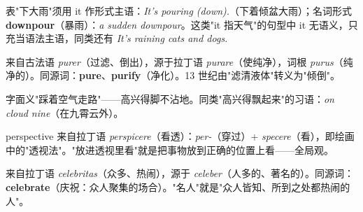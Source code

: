 \documentclass[../main.tex]{subfiles}
\begin{document}
\begin{gram}[it 作主语表天气]
表"下大雨"须用 it 作形式主语：\textit{It's pouring (down).}（下着倾盆大雨）；名词形式 \textbf{downpour}（暴雨）：\textit{a sudden downpour}。这类"it 指天气"的句型中 it 无语义，只充当语法主语，同类还有 \textit{It's raining cats and dogs.}
\end{gram}

\begin{origin}
来自古法语 \textit{purer}（过滤、倒出），源于拉丁语 \textit{purare}（使纯净），词根 \textit{purus}（纯净的）。同源词：\textbf{pure}、\textbf{purify}（净化）。13 世纪由"滤清液体"转义为"倾倒"。
\end{origin}



\begin{origin}
字面义"踩着空气走路"——高兴得脚不沾地。同类"高兴得飘起来"的习语：\textit{on cloud nine}（在九霄云外）。
\end{origin}



\begin{origin}
perspective 来自拉丁语 \textit{perspicere}（看透）：\textit{per-}（穿过）+ \textit{specere}（看），即绘画中的"透视法"。"放进透视里看"就是把事物放到正确的位置上看——全局观。
\end{origin}





\begin{origin}
来自拉丁语 \textit{celebritas}（众多、热闹），源于 \textit{celeber}（人多的、著名的）。同源词：\textbf{celebrate}（庆祝：众人聚集的场合）。"名人"就是"众人皆知、所到之处都热闹的人"。
\end{origin}

\end{document}
